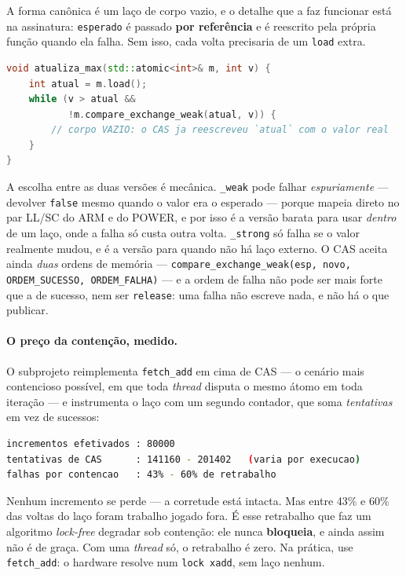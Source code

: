 A forma canônica é um laço de corpo vazio, e o detalhe que a faz funcionar está
na assinatura: \texttt{esperado} é passado \textbf{por referência} e é reescrito
pela própria função quando ela falha. Sem isso, cada volta precisaria de um
\texttt{load} extra.

\begin{lstlisting}[style=bt, language=C++,
    caption={O laço de CAS, forma canônica.}]
void atualiza_max(std::atomic<int>& m, int v) {
    int atual = m.load();
    while (v > atual &&
           !m.compare_exchange_weak(atual, v)) {
        // corpo VAZIO: o CAS ja reescreveu `atual` com o valor real
    }
}
\end{lstlisting}

A escolha entre as duas versões é mecânica. \texttt{\_weak} pode falhar
\emph{espuriamente} --- devolver \texttt{false} mesmo quando o valor era o
esperado --- porque mapeia direto no par LL/SC do ARM e do POWER, e por isso é a
versão barata para usar \emph{dentro} de um laço, onde a falha só custa outra
volta. \texttt{\_strong} só falha se o valor realmente mudou, e é a versão para
quando não há laço externo. O CAS aceita ainda
\emph{duas} ordens de memória ---
\texttt{compare\_exchange\_weak(esp, novo, ORDEM\_SUCESSO, ORDEM\_FALHA)} --- e
a ordem de falha não pode ser mais forte que a de sucesso, nem ser
\texttt{release}: uma falha não escreve nada, e não há o que publicar.

\paragraph{O preço da contenção, medido.} O subprojeto reimplementa
\texttt{fetch\_add} em cima de CAS --- o cenário mais contencioso possível, em
que toda \emph{thread} disputa o mesmo átomo em toda iteração --- e instrumenta
o laço com um segundo contador, que soma \emph{tentativas} em vez de sucessos:

\begin{lstlisting}[style=bt, language=bash,
    caption={Saída de \texttt{src/concurrency2/}: 4 \emph{threads} $\times$
             20\,000 incrementos por CAS.}]
incrementos efetivados : 80000
tentativas de CAS      : 141160 - 201402   (varia por execucao)
falhas por contencao   : 43% - 60% de retrabalho
\end{lstlisting}

Nenhum incremento se perde --- a corretude está intacta. Mas entre 43\% e 60\%
das voltas do laço foram trabalho jogado fora. É esse retrabalho que faz um
algoritmo \emph{lock-free} degradar sob contenção: ele nunca \textbf{bloqueia},
e ainda assim não é de graça. Com uma \emph{thread} só, o retrabalho é zero. Na
prática, use \texttt{fetch\_add}: o hardware resolve num \texttt{lock xadd}, sem
laço nenhum.

